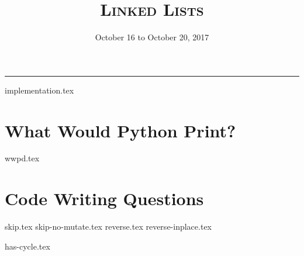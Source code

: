 \documentclass{exam}
\title{\textsc{Linked Lists}}
\date{October 16 to October 20, 2017}
\begin{document}
\maketitle
\rule{\textwidth}{0.15em}
\fontsize{12}{15}\selectfont

{implementation.tex}
\begin{questions}
\section{What Would Python Print?}

{wwpd.tex}
\section{Code Writing Questions}
{skip.tex}
{skip-no-mutate.tex}
{reverse.tex}
{reverse-inplace.tex}

\pagebreak

{has-cycle.tex}
\end{questions}
\end{document}
